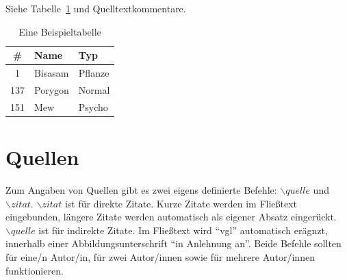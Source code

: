 \documentclass{iwi}
\begin{document}
Siehe Tabelle~\ref{tbl:pokemon} und Quelltextkommentare.

\begin{table}
\begin{center}
\begin{tabular}{c|ll} %
	\# & Name & Typ	\\
	\hline   
	1      & Bisasam   & Pflanze   \\
	137    & Porygon   & Normal    \\
	151    & Mew       & Psycho    \\

\end{tabular}
\caption{Eine Beispieltabelle}
\label{tbl:pokemon}
\end{center}
\end{table}

\section{Quellen}

Zum Angaben von Quellen gibt es zwei eigens definierte Befehle: $\backslash quelle$ und $\backslash zitat$.
$\backslash zitat$ ist für direkte Zitate. Kurze Zitate werden im Fließtext eingebunden, längere Zitate werden automatisch als eigener Absatz eingerückt.
$\backslash quelle$ ist für indirekte Zitate. 
Im Fließtext wird ``vgl'' automatisch erägnzt, innerhalb einer Abbildungsunterschrift ``in Anlehnung an''. 
Beide Befehle sollten für eine/n Autor/in, für zwei Autor/innen sowie für mehrere Autor/innen funktionieren.
\end{document}
